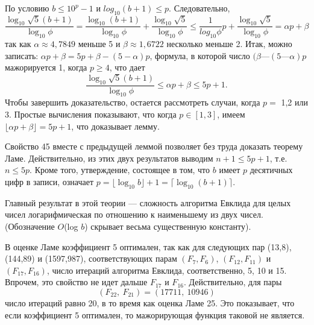 \begin{myproof}
По условию $b \leqslant 10^p - 1$ и $log_{10}{(b+1)} \leqslant p$. Следовательно,
\begin{equation*}
\frac{\log_{10}{\sqrt{5}(b+1)}}{\log_{10}{\phi}} = \frac{\log_{10}{(b+1)}}{\log_{10}{\phi}} + \frac{\log_{10}{\sqrt{5}}}{\log_{10}{\phi}} \leqslant \frac{1}{log_{10}{\phi}}p + \frac{\log_{10}{\sqrt{5}}}{\log_{10}{\phi}} = \alpha p + \beta
\end{equation*}
так как $\alpha \approx 4,7849$ меньше 5 и $\beta \approx 1,6722$ несколько меньше 2. 
Итак, можно записать: $\alpha p + \beta = 5p + \beta - (5 - \alpha)p$, формула, в которой 
число $(\beta — (5 — \alpha)p$ мажорируется 1, когда $p \geq 4$, что дает
\begin{equation*}
\frac{\log_{10}{\sqrt{5}(b+1)}}{\log_{10}{\phi}} \leqslant \alpha p + \beta \leqslant 5p + 1.
\end{equation*}
Чтобы завершить доказательство, остается рассмотреть случаи, 
когда \linebreak$p =$ 1,2 или 3. Простые вычисления показывают, что когда 
$p \in [1,3]$, имеем $\lfloor \alpha p + \beta \rfloor = 5p + 1$, что доказывает лемму.
\end{myproof} 

\begin{myproof}
Свойство 45 вместе с предыдущей леммой позволяет без труда  
доказать теорему Ламе. Действительно, из этих двух результатов  
выводим $n + 1 \leqslant 5p + 1$, т.е. $n \leqslant 5p$. Кроме того, утверждение,  
состоящее в том, что $b$ имеет $p$ десятичных цифр в записи, означает 
$p = \lfloor \log_{10}{b} \rfloor + 1 = \lceil \log_{10}{(b+1)} \rceil$.
\end{myproof}

Главный результат в этой теории — сложность алгоритма  
Евклида для целых чисел логарифмическая по отношению к наименьшему из 
двух чисел. (Обозначение $O$(log $b$) скрывает весьма существенную  
константу).\newline

\begin{mynotice}
В оценке Ламе коэффициент 5 оптимален, так как 
для следующих пар (13,8), (144,89) и (1597,987),  
соответствующих парам $(F_7,F_6)$, $(F_{12},F_{11})$ и $(F_{17},F_{16})$, число итераций  
алгоритма Евклида, соответственно, 5, 10 и 15. Впрочем, это свойство 
не идет дальше $F_{17}$ и $F_{16}$. Действительно, для пары
\begin{equation*}
(F_{22},\: F_{21}) = (17711,\: 10946)
\end{equation*} 
число итераций равно 20, в то время как оценка Ламе 25. Это  
показывает, что если коэффициент 5 оптимален, то мажорирующая 
функция таковой не является. 
\end{mynotice} 
\pagebreak

